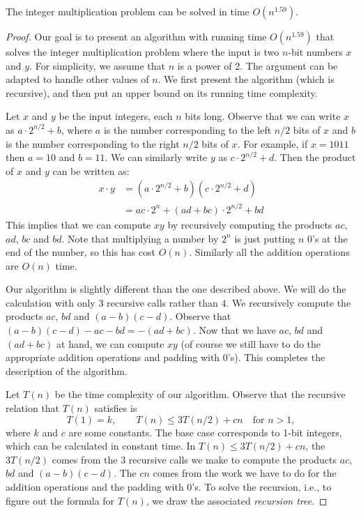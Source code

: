 \begin{flex}
\label{grp:theorem:Karatsuba-algorithm-for-integer-multiplication}

\begin{theorem}
\label{theorem:Karatsuba-algorithm-for-integer-multiplication}
The integer multiplication problem can be solved in time $O(n^{1.59})$.

\end{theorem}

\begin{proof}
\label{prf:time-complexity::goal}
Our goal is to present an algorithm with running time $O(n^{1.59})$ that solves the integer multiplication problem where the input is two $n$-bit numbers $x$ and $y$. For simplicity, we assume that $n$ is a power of 2. The argument can be adapted to handle other values of $n$. We first present the algorithm (which is recursive), and then put an upper bound on its running time complexity.

Let $x$ and $y$ be the input integers, each $n$ bits long. Observe that we can write $x$ as $a \cdot 2^{n/2} + b$, where $a$ is the number corresponding to the left $n/2$ bits of $x$ and $b$ is the number corresponding to the right $n/2$ bits of $x$. For example, if $x = 1011$ then $a = 10$ and $b = 11$. We can similarly write $y$ as $c \cdot 2^{n/2} + d$. Then the product of $x$ and $y$ can be written as:
\[ \begin{align*}
x \cdot y & = (a \cdot 2^{n/2} + b)(c \cdot 2^{n/2} + d) \\
 & = ac \cdot 2^n + (ad + bc) \cdot 2^{n/2} + bd
\end{align*} \]
This implies that we can compute $xy$ by recursively computing the products $ac$, $ad$, $bc$ and $bd$. Note that multiplying a number by $2^n$ is just putting $n$ 0's at the end of the number, so this has cost $O(n)$. Similarly all the addition operations are $O(n)$ time.

Our algorithm is slightly different than the one described above. We will do the calculation with only 3 recursive calls rather than 4. We recursively compute the products $ac$, $bd$ and $(a-b)(c-d)$. Observe that $(a - b)(c - d) - ac - bd = -(ad + bc)$. Now that we have $ac$, $bd$ and $(ad + bc)$ at hand, we can compute $xy$  (of course we still have to do the appropriate addition operations and padding with $0$'s). This completes the description of the algorithm.

Let $T(n)$ be the time complexity of our algorithm. Observe that the recursive relation that $T(n)$ satisfies is
\[
T(1) = k, \quad \quad T(n) \leq 3T(n/2) + cn \quad \text{for $n > 1$},
\]
where $k$ and $c$ are some constants. The base case corresponds to 1-bit integers, which can be calculated in constant time. In $T(n) \leq 3T(n/2) + cn$, the $3T(n/2)$ comes from the 3 recursive calls we make to compute the products $ac$, $bd$ and $(a-b)(c-d)$. The $cn$ comes from the work we have to do for the addition operations and the padding with 0's. To solve the recursion, i.e., to figure out the formula for $T(n)$, we draw the associated \emph{recursion tree}.


\end{proof}
\end{flex}
